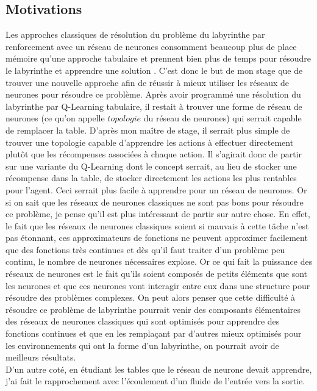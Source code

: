 \documentclass[10pt]{article}
\begin{document}
\subsection{Motivations}
Les approches classiques de résolution du problème du labyrinthe par renforcement avec un réseau de neurones consomment beaucoup plus de place mémoire qu'une approche tabulaire et prennent bien plus de temps pour résoudre le labyrinthe et apprendre une solution \cite{qmaze}. C'est donc le but de mon stage que de trouver une nouvelle approche afin de réussir à mieux utiliser les réseaux de neurones pour résoudre ce problème. 
Après avoir programmé une résolution du labyrinthe par Q-Learning tabulaire, il restait à trouver une forme de réseau de neurones (ce qu'on appelle $\textit{topologie}$ du réseau de neurones) qui serrait capable de remplacer la table. D'après mon maître de stage, il serrait plus simple de trouver une topologie capable d'apprendre les actions à effectuer directement plutôt que les récompenses associées à chaque action. Il s'agirait donc de partir sur une variante du Q-Learning dont le concept serrait, au lieu de stocker une récompense dans la table, de stocker directement les actions les plus rentables pour l'agent. Ceci serrait plus facile à apprendre pour un réseau de neurones. Or si on sait que les réseaux de neurones classiques ne sont pas bons pour résoudre ce problème, je pense qu'il est plus intéressant de partir sur autre chose. En effet, le fait que les réseaux de neurones classiques soient si mauvais à cette tâche n'est pas étonnant, ces approximateurs de fonctions ne peuvent approximer facilement que des fonctions très continues et dès qu'il faut traiter d'un problème peu continu, le nombre de neurones nécessaires explose. Or ce qui fait la puissance des réseaux de neurones est le fait qu'ils soient composés de petits éléments que sont les neurones et que ces neurones vont interagir entre eux dans une structure pour résoudre des problèmes complexes. On peut alors penser que cette difficulté à résoudre ce problème de labyrinthe pourrait venir des composants élémentaires des réseaux de neurones classiques qui sont optimisés pour apprendre des fonctions continues et que en les remplaçant par d'autres mieux optimisés pour les environnements qui ont la forme d'un labyrinthe, on pourrait avoir de meilleurs résultats.\\
 D'un autre coté, en étudiant les tables que le réseau de neurone devait apprendre, j'ai fait le rapprochement avec l'écoulement d'un fluide de l'entrée vers la sortie.
\end{document}
